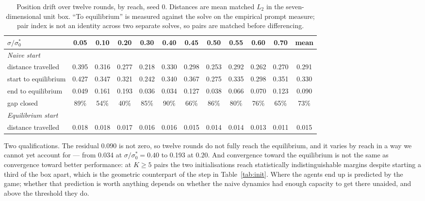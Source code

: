 \documentclass{article}
\begin{document}
\begin{table}[t]
\centering
\caption{Position drift over twelve rounds, by reach, seed 0. Distances are mean matched $L_2$ in the
seven-dimensional unit box. ``To equilibrium'' is measured against the solve on the empirical prompt
measure; pair index is not an identity across two separate solves, so pairs are matched before
differencing.}
\label{tab:drift}
\small
\setlength{\tabcolsep}{4pt}
\begin{tabular}{lcccccccccc|c}
\toprule
$\sigma/\sigma_0^*$ & 0.05 & 0.10 & 0.20 & 0.30 & 0.40 & 0.45 & 0.50 & 0.55 & 0.60 & 0.70 & mean \\
\midrule
\multicolumn{12}{l}{\emph{Naive start}} \\
distance travelled      & 0.395 & 0.316 & 0.277 & 0.218 & 0.330 & 0.298 & 0.253 & 0.292 & 0.262 & 0.270 & 0.291 \\
start to equilibrium    & 0.427 & 0.347 & 0.321 & 0.242 & 0.340 & 0.367 & 0.275 & 0.335 & 0.298 & 0.351 & 0.330 \\
end to equilibrium      & 0.049 & 0.161 & 0.193 & 0.036 & 0.034 & 0.127 & 0.038 & 0.066 & 0.070 & 0.123 & 0.090 \\
gap closed              & 89\% & 54\% & 40\% & 85\% & 90\% & 66\% & 86\% & 80\% & 76\% & 65\% & 73\% \\
\midrule
\multicolumn{12}{l}{\emph{Equilibrium start}} \\
distance travelled      & 0.018 & 0.018 & 0.017 & 0.016 & 0.016 & 0.015 & 0.014 & 0.014 & 0.013 & 0.011 & 0.015 \\
\bottomrule
\end{tabular}
\end{table}

Two qualifications. The residual 0.090 is not zero, so twelve rounds do not fully reach the
equilibrium, and it varies by reach in a way we cannot yet account for --- from 0.034 at
$\sigma/\sigma_0^*=0.40$ to 0.193 at $0.20$. And convergence toward the equilibrium is not the same
as convergence toward better performance: at $K \ge 5$ pairs the two initialisations reach
statistically indistinguishable margins despite starting a third of the box apart, which is the
geometric counterpart of the step in Table~\ref{tab:init}. Where the agents end up is predicted by
the game; whether that prediction is worth anything depends on whether the naive dynamics had enough
capacity to get there unaided, and above the threshold they do.
\end{document}
